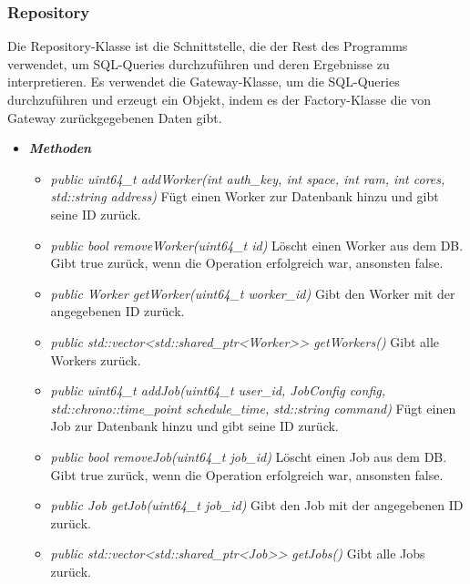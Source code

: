 \documentclass[a4paper,12pt]{article}
\begin{document}
\subsubsection{Repository}

Die Repository-Klasse ist die Schnittstelle, die der Rest des Programms verwendet, um SQL-Queries durchzuführen und deren Ergebnisse zu interpretieren. Es verwendet die Gateway-Klasse, um die SQL-Queries durchzuführen und erzeugt ein Objekt, indem es der Factory-Klasse die von Gateway zurückgegebenen Daten gibt.

	\begin{itemize}[label={}]
	
		\item \textit{\textbf{Methoden}}
			\begin{itemize}[label={\textbullet}]
				\item \textit{public uint64\_t addWorker(int auth\_key, int space, int ram, int cores, std::string address)} Fügt einen Worker zur Datenbank hinzu und gibt seine ID zurück.
				
				\item \textit{public bool removeWorker(uint64\_t id)} Löscht einen Worker aus dem DB. Gibt true zurück, wenn die Operation erfolgreich war, ansonsten false.
				
				\item \textit{public Worker getWorker(uint64\_t worker\_id)} Gibt den Worker mit der angegebenen ID zurück.
				
				\item \textit{public std::vector<std::shared\_ptr<Worker>> getWorkers()} Gibt alle Workers zurück.
				
				\item \textit{public uint64\_t addJob(uint64\_t user\_id, JobConfig config, std::chrono::time\_point schedule\_time, std::string command)} Fügt einen Job zur Datenbank hinzu und gibt seine ID zurück. 
				
				\item \textit{public bool removeJob(uint64\_t job\_id)} Löscht einen Job aus dem DB. Gibt true zurück, wenn die Operation erfolgreich war, ansonsten false.
				
				\item \textit{public Job getJob(uint64\_t job\_id)} Gibt den Job mit der angegebenen ID zurück.
				
				\item \textit{public std::vector<std::shared\_ptr<Job>> getJobs()} Gibt alle Jobs zurück.
				

\end{itemize}
\end{itemize}
\end{document}
